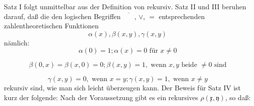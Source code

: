 \documentclass[draft]{scrartcl}
\newcounter{commentaryNumber}
\begin{document}
Satz I folgt unmittelbar aus der Definition von \glqq rekursiv\grqq. Satz II und III beruhen darauf, daß die
den logischen Begriffen $\overline{\phantom{XX}}$, $\lor$, $=$ entsprechenden zahlentheoretischen Funktionen
\begin{equation*}
	\alpha\left(x\right), \beta\left(x, y\right), \gamma\left(x, y\right)
\end{equation*}
nämlich:
\begin{equation*}
	\alpha\left(0\right) = 1; \alpha\left(x\right) = 0\text{ für } x \neq 0
\end{equation*}

\begin{equation*}
	\beta\left(0, x\right) = \beta\left(x, 0\right) = 0; \beta\left(x, y\right) = 1,
	\text{ wenn } x, y \text{ beide } \neq 0 \text{ sind}
\end{equation*}

\begin{equation*}
	\gamma\left(x, y\right) = 0, \text{ wenn } x = y; \gamma\left(x, y\right) = 1, \text{ wenn } x \neq y
\end{equation*}
rekursiv sind, wie man sich leicht überzeugen kann. Der
Beweis für Satz IV ist kurz der folgende: Nach der
Voraussetzung gibt es ein rekursives $\rho\left(\mathfrak{x}, \mathfrak{y}\right)$, so daß:
\end{document}
